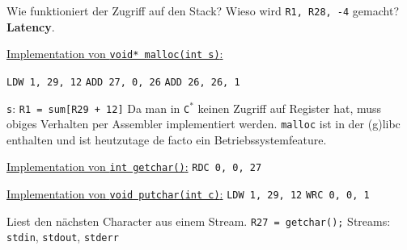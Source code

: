 \par{
    \noindent
    Wie funktioniert der Zugriff auf den Stack? \newline
    Wieso wird \texttt{R1, R28, -4} gemacht? \textbf{Latency}.
}

\par{
    \noindent
    \underline{Implementation von \texttt{void* malloc(int s)}:}
    \par{
        \indent\texttt{LDW 1, 29, 12} \newline
        \indent\texttt{ADD 27, 0, 26} \newline
        \indent\texttt{ADD 26, 26, 1} \newline
    }
    \par{
        \noindent
        \texttt{s}: \texttt{R1 = sum[R29 + 12]} \newline
        Da man in \texttt{C$^*$} keinen Zugriff auf Register hat, muss obiges Verhalten per Assembler implementiert werden. \newline
        \texttt{malloc} ist in der (g)libc enthalten und ist heutzutage de facto ein Betriebssystemfeature.
    }
    \par{
    	\noindent\underline{Implementation von \texttt{int getchar()}:} \newline
        \indent\texttt{RDC 0, 0, 27}
    }
    \par{
    	\noindent\underline{Implementation von \texttt{void putchar(int c)}:} \newline
        \indent\texttt{LDW 1, 29, 12} \newline
        \indent\texttt{WRC 0, 0, 1}
    }
    \par{
    	\noindent
    	Liest den n{\"a}chsten Character aus einem Stream. \newline
    	\texttt{R27 = getchar();} \newline
    	Streams: \texttt{stdin}, \texttt{stdout}, \texttt{stderr}
    }
    \par{
        \noindent
        \begin{figure}[H]
            \centering
\end{figure}}}
